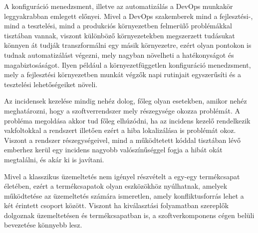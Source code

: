 A konfiguráció menedzsment, illetve az automatizálás a DevOps munkakör leggyakrabban emlegett előnyei. Mivel a DevOps szakemberek mind a fejlesztési-, mind a tesztelési, mind a produkciós környezetben felmerülő problémákkal tisztában vannak, viszont különböző környezetekben megszerzett tudásukat könnyen át tudják transzformálni egy másik környezetre, ezért olyan pontokon is tudnak automatizálást végezni, mely nagyban növelheti a hatékonyságot és magabiztosáságot. Ilyen például a környezetfüggetlen konfiguráció menedzsment, mely a fejlesztési környezetben munkát végzők napi rutinjait egyszerűsíti és a tesztelési lehetőségeiket növeli.

Az incidensek kezelése mindig nehéz dolog, főleg olyan esetekben, amikor nehéz meghatározni, hogy a szoftverrendszer mely részegysége okozza problémát. A probléma megoldása akkor tud főleg elhúzódni, ha az incidens kezelő rendelkezik vakfoltokkal a rendszert illetően ezért a hiba lokalizálása is problémát okoz. Viszont a rendszer részegységeivel, mind a működtetett kóddal tisztában lévő emberhez kerül egy incidens nagyobb valószínűséggel fogja a hibát okát megtalálni, és akár ki is javítani.

Mivel a klasszikus üzemeltetés nem igényel részvételt a egy-egy termékcsapat életében, ezért a termékcsapatok olyan eszközökhöz nyúlhatnak, amelyek működtetése az üzemeltetés számára ismeretlen, amely konfliktusforrás lehet a két érintett csoport között. Viszont ha kiválasztási folyamatban szereplők dolgoznak üzemeltetésen és termékcsapatban is, a szoftverkomponens cégen belüli bevezetése könnyebb lesz.